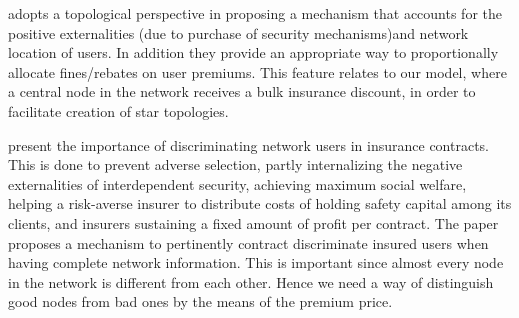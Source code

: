 \cite{pal2012cyberinsurance} adopts a topological perspective in proposing a mechanism that accounts for the positive
 externalities (due to purchase of security mechanisms)and network location of users. In addition they provide an appropriate way to proportionally allocate fines/rebates on user premiums. This feature relates to our model, where a central node in the network receives a bulk insurance discount, in order to facilitate creation of star topologies. 
  
\cite{paldifferentiating} present the importance of discriminating network users in insurance contracts. This is done to prevent adverse selection, partly internalizing the negative externalities of interdependent security, achieving maximum social welfare, helping a risk-averse insurer to distribute costs of holding safety capital among its clients, and insurers sustaining a fixed amount of profit per contract.
The paper proposes a mechanism to pertinently contract discriminate insured users when having complete network information. This is important since almost every node in the network is different from each other. Hence we need a way of distinguish good nodes from bad ones by the means of the premium price.

  